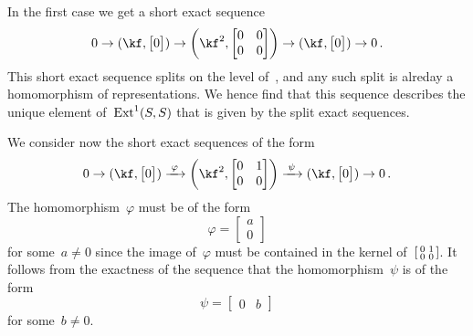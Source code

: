 \documentclass[a4paper,11pt]{scrartcl}
\begin{document}
In the first case we get a short exact sequence
\[
  0
  \to
  (\kf, \begin{bmatrix} 0 \end{bmatrix})
  \to
  \biggl( \kf^2, \begin{bmatrix} 0 & 0 \\ 0 & 0 \end{bmatrix} \biggr)
  \to
  (\kf, \begin{bmatrix} 0 \end{bmatrix})
  \to
  0 \,.
\]
This short exact sequence splits on the level of~\vectorspaces{$\kf$}, and any such split is alreday a homomorphism of representations.
We hence find that this sequence describes the unique element of~$\operatorname{Ext}^1(S,S)$ that is given by the split exact sequences.

We consider now the short exact sequences of the form
\begin{equation}
  \label{nonsplit ses}
  0
  \to
  (\kf, \begin{bmatrix} 0 \end{bmatrix})
  \xlongto{\varphi}
  \biggl( \kf^2, \begin{bmatrix} 0 & 1 \\ 0 & 0 \end{bmatrix} \biggr)
  \xlongto{\psi}
  (\kf, \begin{bmatrix} 0 \end{bmatrix})
  \to
  0 \,.
\end{equation}
The homomorphism~$\varphi$ must be of the form
\[
  \varphi
  =
  \begin{bmatrix}
    a \\
    0
  \end{bmatrix}
\]
for some~$a \neq 0$ since the image of~$\varphi$ must be contained in the kernel of~$\begin{bsmallmatrix} 0 & 1 \\ 0 & 0 \end{bsmallmatrix}$.
It follows from the exactness of the sequence that the homomorphism~$\psi$ is of the form
\[
  \psi
  =
  \begin{bmatrix}
    0 & b
  \end{bmatrix}
\]
for some~$b \neq 0$.
\end{document}
